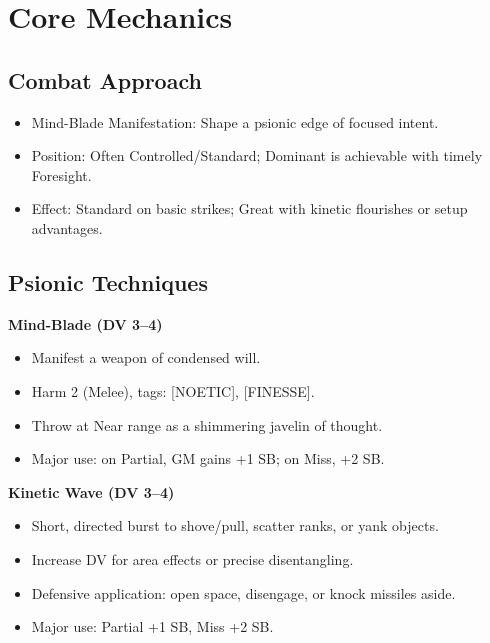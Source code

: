 \documentclass[11pt]{article}
\newenvironment{talentbox}[1]{%
  \begin{mdframed}[backgroundcolor=gray!10, linewidth=1pt, linecolor=gray!50]
  \textbf{#1}\\
}{\end{mdframed}}
\begin{document}
\section*{Core Mechanics}

\subsection*{Combat Approach}
\begin{itemize}[leftmargin=*]
    \item Mind-Blade Manifestation: Shape a psionic edge of focused intent.
    \item Position: Often Controlled/Standard; Dominant is achievable with timely Foresight.
    \item Effect: Standard on basic strikes; Great with kinetic flourishes or setup advantages.
\end{itemize}

\subsection*{Psionic Techniques}

\begin{talentbox}{Mind-Blade (DV 3--4)}
    \begin{itemize}[leftmargin=*]
        \item Manifest a weapon of condensed will.
        \item Harm 2 (Melee), tags: [NOETIC], [FINESSE].
        \item Throw at Near range as a shimmering javelin of thought.
        \item Major use: on Partial, GM gains +1 SB; on Miss, +2 SB.
    \end{itemize}
\end{talentbox}

\begin{talentbox}{Kinetic Wave (DV 3--4)}
    \begin{itemize}[leftmargin=*]
        \item Short, directed burst to shove/pull, scatter ranks, or yank objects.
        \item Increase DV for area effects or precise disentangling.
        \item Defensive application: open space, disengage, or knock missiles aside.
        \item Major use: Partial +1 SB, Miss +2 SB.
    \end{itemize}
\end{talentbox}
\end{document}
